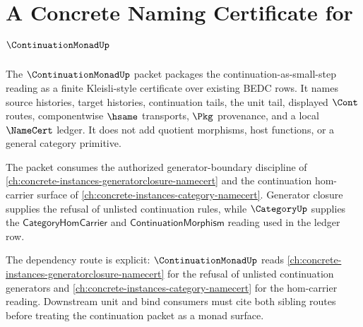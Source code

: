 \chapter{A Concrete Naming Certificate for $\ContinuationMonadUp$}
\label{ch:concrete-instances-continuationmonad-namecert}

The $\ContinuationMonadUp$ packet packages the continuation-as-small-step reading as a finite Kleisli-style certificate over existing BEDC rows. It names source histories, target histories, continuation tails, the unit tail, displayed $\Cont$ routes, componentwise $\hsame$ transports, $\Pkg$ provenance, and a local $\NameCert$ ledger. It does not add quotient morphisms, host functions, or a general category primitive.

The packet consumes the authorized generator-boundary discipline of \autoref{ch:concrete-instances-generatorclosure-namecert} and the continuation hom-carrier surface of \autoref{ch:concrete-instances-category-namecert}. Generator closure supplies the refusal of unlisted continuation rules, while $\CategoryUp$ supplies the $\mathsf{CategoryHomCarrier}$ and $\mathsf{ContinuationMorphism}$ reading used in the ledger row.

The dependency route is explicit: $\ContinuationMonadUp$ reads \autoref{ch:concrete-instances-generatorclosure-namecert} for the refusal of unlisted continuation generators and \autoref{ch:concrete-instances-category-namecert} for the hom-carrier reading. Downstream unit and bind consumers must cite both sibling routes before treating the continuation packet as a monad surface.

